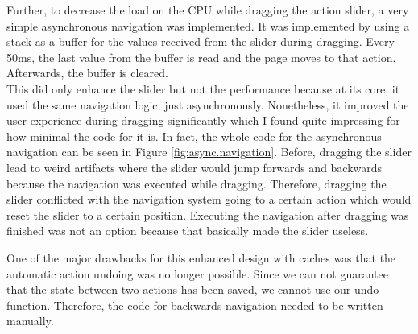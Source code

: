 Further, to decrease the load on the CPU while dragging the action slider, a very simple asynchronous navigation was implemented. It was implemented by using a stack as a buffer for the values received from the slider during dragging. Every 50ms, the last value from the buffer is read and the page moves to that action. Afterwards, the buffer is cleared. \\
This did only enhance the slider but not the performance because at its core, it used the same navigation logic; just asynchronously. Nonetheless, it improved the user experience during dragging significantly which I found quite impressing for how minimal the code for it is. In fact, the whole code for the asynchronous navigation can be seen in Figure \ref{fig:async.navigation}. Before, dragging the slider lead to weird artifacts where the slider would jump forwards and backwards because the navigation was executed while dragging. Therefore, dragging the slider conflicted with the navigation system going to a certain action which would reset the slider to a certain position. Executing the navigation after dragging was finished was not an option because that basically made the slider useless.

One of the major drawbacks for this enhanced design  with caches was that the automatic action undoing was no longer possible. Since we can not guarantee that the state between two actions has been saved, we cannot use our undo function. Therefore, the code for backwards navigation needed to be written manually.

